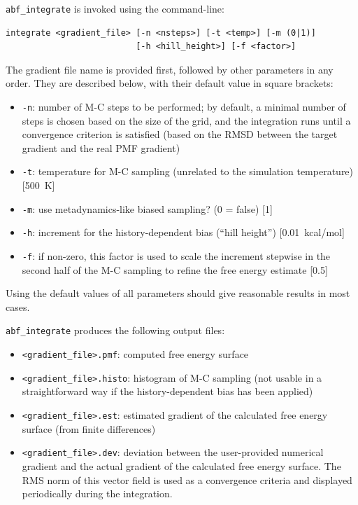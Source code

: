 \texttt{abf\_integrate} is invoked using the command-line:
{\small
\begin{verbatim}
integrate <gradient_file> [-n <nsteps>] [-t <temp>] [-m (0|1)]
                          [-h <hill_height>] [-f <factor>]
\end{verbatim}
}

The gradient file name is provided first, followed by other parameters in any order.
They are described below, with their default value in square brackets:
\begin{itemize}
\setlength{\itemsep}{0pt}
\item \texttt{-n}: number of M-C steps to be performed; by default, a minimal number of
steps is chosen based on the size of the grid, and the integration runs until a convergence
criterion is satisfied (based on the RMSD between the target gradient and the real PMF gradient)
\item \texttt{-t}: temperature for M-C sampling (unrelated to the simulation temperature)
  [500~K]
\item \texttt{-m}: use metadynamics-like biased sampling? (0 = false) [1]
\item \texttt{-h}: increment for the history-dependent bias (``hill height'') [0.01~kcal/mol]
\item \texttt{-f}: if non-zero, this factor is used to scale the increment stepwise in the 
  second half of the M-C sampling to refine the free energy estimate [0.5]
\end{itemize}

Using the default values of all parameters should give reasonable results in most cases.

\bigskip
\texttt{abf\_integrate} produces the following output files:
\begin{itemize}
\setlength{\itemsep}{0pt}
\item \texttt{<gradient\_file>.pmf}: computed free energy surface
\item \texttt{<gradient\_file>.histo}: histogram of M-C sampling (not
usable in a straightforward way if the history-dependent bias has been applied)
\item \texttt{<gradient\_file>.est}: estimated gradient of the calculated free energy surface
(from finite differences)
\item \texttt{<gradient\_file>.dev}: deviation between the user-provided numerical gradient
and the actual gradient of the calculated free energy surface. The RMS norm of this vector
field is used as a convergence criteria and displayed periodically during the integration.
\end{itemize}

